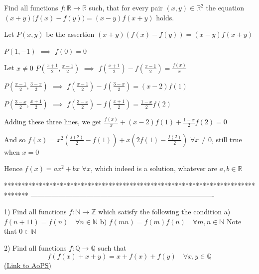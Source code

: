 \begin{solution}
	\begin{tcolorbox}Find all functions $f:\mathbb{R}\to\mathbb{R}$ such, that for every pair $(x,y)\in\mathbb{R}^2$ the equation
$(x+y)\big(f(x)-f(y)\big)=(x-y)f(x+y)$
holds.\end{tcolorbox}
Let $P(x,y)$ be the assertion $(x+y)(f(x)-f(y))=(x-y)f(x+y)$

$P(1,-1)$ $\implies$ $f(0)=0$

Let $x\ne 0$
$P(\frac{x+1}2,\frac{x-1}2)$ $\implies$ $f(\frac{x+1}2)-f(\frac{x-1}2)=\frac{f(x)}x$

$P(\frac{x-1}2,\frac{3-x}2)$ $\implies$ $f(\frac{x-1}2)-f(\frac{3-x}2)=(x-2)f(1)$

$P(\frac{3-x}2,\frac{x+1}2)$ $\implies$ $f(\frac{3-x}2)-f(\frac{x+1}2)=\frac{1-x}2f(2)$

Adding these three lines, we get $\frac{f(x)}x+(x-2)f(1)+\frac{1-x}2f(2)=0$

And so $f(x)=x^2(\frac{f(2)}2-f(1))+x(2f(1)-\frac{f(2)}2)$ $\forall x\ne 0$, still true when $x=0$

Hence $\boxed{f(x)=ax^2+bx}$ $\forall x$, which indeed is a solution, whatever are $a,b\in\mathbb R$
\end{solution}
*******************************************************************************
-------------------------------------------------------------------------------

\begin{problem}
	1) Find all functions $f:\mathbb{N}\to\mathbb{Z}$ which satisfy the following the condition 
a) $f(n+11)=f(n) \quad \forall n \in \mathbb{N}$
b) $f(mn)=f(m)f(n) \quad \forall m,n \in \mathbb{N}$
Note that $0 \in \mathbb{N}$

2) Find all functions $f:\mathbb{Q}\to\mathbb{Q}$  such that
\[f(f(x)+x+y)=x+f(x)+f(y) \quad \forall x,y \in \mathbb{Q}\]
	\flushright \href{https://artofproblemsolving.com/community/c6h563453}{(Link to AoPS)}
\end{problem}



